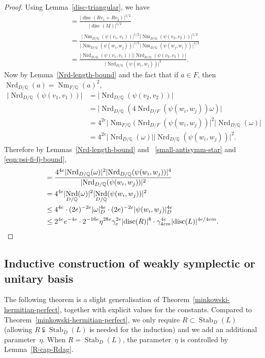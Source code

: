 \documentclass[11pt]{article}
\numberwithin{equation}{section}
\newcommand{\bQ}{\mathbb{Q}}
\DeclareMathOperator{\disc}{disc}
\DeclareMathOperator{\Nm}{Nm}
\DeclareMathOperator{\Nrd}{Nrd}
\DeclareMathOperator{\Stab}{Stab}
\newcommand{\abs}[1]{\lvert #1 \rvert}
\begin{document}
\begin{proof}
Using Lemma~\ref{disc-triangular}, we have
\begin{align*}
[M : Rv_1 + Rv_2]
& = \frac{\abs{\disc(Rv_1 + Rv_2)}^{1/2}}{\abs{\disc(M)}^{1/2}}
\\& = \frac{\abs{\Nm_{D/\bQ}(\psi(v_1, v_1))}^{1/2} \abs{\Nm_{D/\bQ}(\psi(v_2, v_2))}^{1/2}}{\abs{\Nm_{D/\bQ}(\psi(w_i, w_j))}^{1/2} \abs{\Nm_{D/\bQ}(\psi(w_j, w_i))}^{1/2}}
\\& = \frac{\abs{\Nrd_{D/\bQ}(\psi(v_1, v_1))} \abs{\Nrd_{D/\bQ}(\psi(v_2, v_2))}}{\abs{\Nrd_{D/\bQ}(\psi(w_i, w_j))}^2}.
\end{align*}
Now by Lemma~\ref{Nrd-length-bound} and the fact that if $a \in F$, then $\Nrd_{D/\bQ}(a) = \Nm_{F/\bQ}(a)^2$,
\begin{align*}
\abs{\Nrd_{D/\bQ}(\psi(v_1, v_1))}
& = \abs{\Nrd_{D/\bQ}(\psi(v_2, v_2))}
\\& = \abs{\Nrd_{D/\bQ}(4 \Nrd_{D/F}(\psi(w_i, w_j)) \omega)}
\\& = 4^{2e} \abs{\Nm_{F/\bQ}(\Nrd_{D/F}(\psi(w_i, w_j))}^2 \abs{\Nrd_{D/\bQ}(\omega)}
\\& = 4^{2e} \abs{\Nrd_{D/\bQ}(\omega)} \abs{\Nrd_{D/\bQ}(\psi(w_i, w_j))}^2.
\end{align*}
Therefore by Lemmas~\ref{Nrd-length-bound} and~ \ref{small-antisymm-star} and \eqref{eqn:psi-fi-fj-bound},
\begin{align*}
[M : Rv_1 + Rv_2]
& = \frac{4^{4e} \abs{\Nrd_{D/\bQ}(\omega)}^2 \abs{\Nrd_{D/\bQ}(\psi(w_i, w_j))}^4}{\abs{\Nrd_{D/\bQ}(\psi(w_i, w_j))}^2}
\\& = 4^{4e} \abs{\Nrd_{D/\bQ}(\omega)}^2 \abs{\Nrd_{D/\bQ}(\psi(w_i, w_j))}^2
\\& \leq 4^{4e} \cdot (2e)^{-2e} \abs{\omega}_D^{4e} \cdot (2e)^{-2e} \abs{\psi(w_i, w_j)}_D^{4e}
\\& \leq 2^{4e} e^{-4e} \cdot 2^{-16e} \eta^{28e} \gamma_e^{2e} \abs{\disc(R)}^8 \cdot \gamma_{4em}^{4e} \abs{\disc(L)}^{4e/4em}.
\qedhere
\end{align*}
\end{proof}

\subsection{Inductive construction of weakly symplectic or unitary basis}

The following theorem is a slight generalisation of Theorem~\ref{minkowski-hermitian-perfect}, together with explicit values for the constants.
Compared to Theorem~\ref{minkowski-hermitian-perfect}, we only require $R \subset \Stab_D(L)$ (allowing $R \subsetneqq \Stab_D(L)$ is needed for the induction) and we add an additional parameter~$\eta$.
When $R = \Stab_D(L)$, the parameter~$\eta$ is controlled by Lemma~\ref{R-cap-Rdag}.
\end{document}
